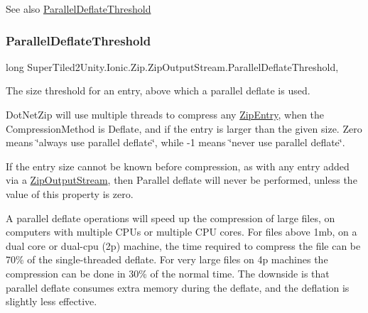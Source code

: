 \begin{DoxySeeAlso}{See also}
\mbox{\hyperlink{class_super_tiled2_unity_1_1_ionic_1_1_zip_1_1_zip_output_stream_a9918f5fa946840eb0ffee089ce5485b8}{Parallel\+Deflate\+Threshold}}


\end{DoxySeeAlso}
\mbox{\label{class_super_tiled2_unity_1_1_ionic_1_1_zip_1_1_zip_output_stream_a9918f5fa946840eb0ffee089ce5485b8}} 
\subsubsection{\texorpdfstring{Parallel\+Deflate\+Threshold}{ParallelDeflateThreshold}}
{\footnotesize\ttfamily long Super\+Tiled2\+Unity.\+Ionic.\+Zip.\+Zip\+Output\+Stream.\+Parallel\+Deflate\+Threshold\hspace{0.3cm}{\ttfamily [get]}, {\ttfamily [set]}}



The size threshold for an entry, above which a parallel deflate is used. 

Dot\+Net\+Zip will use multiple threads to compress any \mbox{\hyperlink{class_super_tiled2_unity_1_1_ionic_1_1_zip_1_1_zip_entry}{Zip\+Entry}}, when the {\ttfamily Compression\+Method} is Deflate, and if the entry is larger than the given size. Zero means \char`\"{}always use parallel
    deflate\char`\"{}, while -\/1 means \char`\"{}never use parallel deflate\char`\"{}. 

If the entry size cannot be known before compression, as with any entry added via a \mbox{\hyperlink{class_super_tiled2_unity_1_1_ionic_1_1_zip_1_1_zip_output_stream}{Zip\+Output\+Stream}}, then Parallel deflate will never be performed, unless the value of this property is zero. 

A parallel deflate operations will speed up the compression of large files, on computers with multiple C\+P\+Us or multiple C\+PU cores. For files above 1mb, on a dual core or dual-\/cpu (2p) machine, the time required to compress the file can be 70\% of the single-\/threaded deflate. For very large files on 4p machines the compression can be done in 30\% of the normal time. The downside is that parallel deflate consumes extra memory during the deflate, and the deflation is slightly less effective. 

